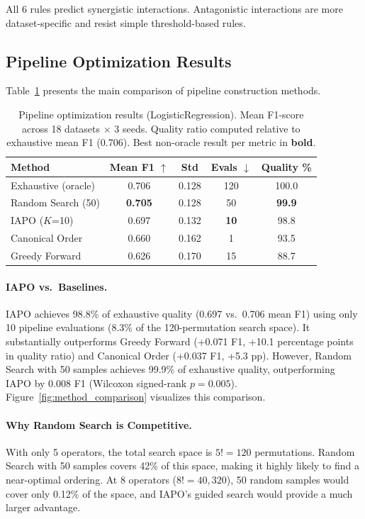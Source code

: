 \documentclass[preprint]{article}
\begin{document}
All 6 rules predict synergistic interactions. Antagonistic interactions are more dataset-specific and resist simple threshold-based rules.

\subsection{Pipeline Optimization Results}

Table~\ref{tab:main_results} presents the main comparison of pipeline construction methods.

\begin{table}[t]
\caption{Pipeline optimization results (LogisticRegression). Mean F1-score across 18 datasets $\times$ 3 seeds. Quality ratio computed relative to exhaustive mean F1 (0.706). Best non-oracle result per metric in \textbf{bold}.}
\label{tab:main_results}
\centering
\begin{tabular}{lcccc}
\toprule
Method & Mean F1 $\uparrow$ & Std & Evals $\downarrow$ & Quality \% \\
\midrule
Exhaustive (oracle) & 0.706 & 0.128 & 120 & 100.0 \\
Random Search (50)  & \textbf{0.705} & 0.128 & 50  & \textbf{99.9} \\
IAPO ($K$=10)       & 0.697 & 0.132 & \textbf{10} & 98.8 \\
Canonical Order     & 0.660 & 0.162 & 1   & 93.5 \\
Greedy Forward      & 0.626 & 0.170 & 15  & 88.7 \\
\bottomrule
\end{tabular}
\end{table}

\paragraph{IAPO vs.\ Baselines.} IAPO achieves 98.8\% of exhaustive quality (0.697 vs.\ 0.706 mean F1) using only 10 pipeline evaluations (8.3\% of the 120-permutation search space). It substantially outperforms Greedy Forward (+0.071 F1, +10.1 percentage points in quality ratio) and Canonical Order (+0.037 F1, +5.3 pp). However, Random Search with 50 samples achieves 99.9\% of exhaustive quality, outperforming IAPO by 0.008 F1 (Wilcoxon signed-rank $p = 0.005$). Figure~\ref{fig:method_comparison} visualizes this comparison.

\paragraph{Why Random Search is Competitive.} With only 5 operators, the total search space is $5! = 120$ permutations. Random Search with 50 samples covers 42\% of this space, making it highly likely to find a near-optimal ordering. At 8 operators ($8! = 40{,}320$), 50 random samples would cover only 0.12\% of the space, and IAPO's guided search would provide a much larger advantage.
\end{document}
